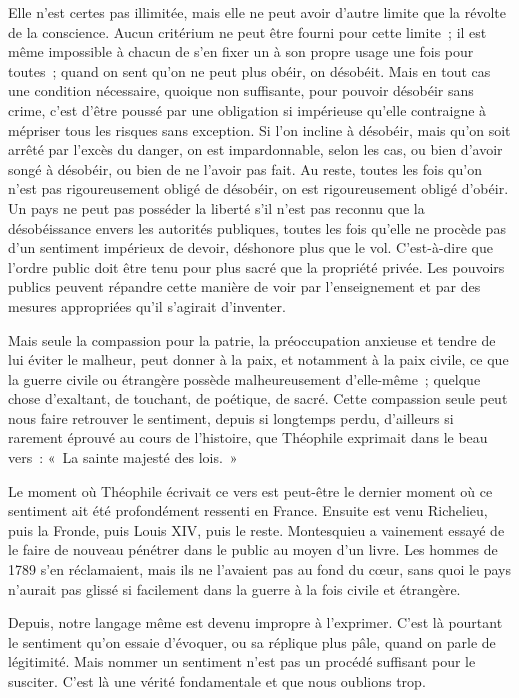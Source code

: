 \documentclass[french,twoside]{book} %
\begin{document}
Elle n'est certes pas illimitée, mais elle ne peut avoir d'autre limite que la révolte de la conscience. Aucun critérium ne peut être fourni pour cette limite ; il est même impossible à chacun de s'en fixer un à son propre usage une fois pour toutes ; quand on sent qu'on ne peut plus obéir, on désobéit. Mais en tout cas une condition nécessaire, quoique non suffisante, pour pouvoir désobéir sans crime, c'est d'être poussé par une obligation si impérieuse qu'elle contraigne à mépriser tous les risques sans exception. Si l'on incline à désobéir, mais qu'on soit arrêté par l'excès du danger, on est impardonnable, selon les cas, ou bien d'avoir songé à désobéir, ou bien de ne l'avoir pas fait. Au reste, toutes les fois qu'on n'est pas rigoureusement obligé de désobéir, on est rigoureusement obligé d'obéir. Un pays ne peut pas posséder la liberté s'il n'est pas reconnu que la désobéissance envers les autorités publiques, toutes les fois qu'elle ne procède pas d'un sentiment impérieux de devoir, déshonore plus que le vol. C'est-à-dire que l'ordre public doit être tenu pour plus sacré que la propriété privée. Les pouvoirs publics peuvent répandre cette manière de voir par l'enseignement et par des mesures appropriées qu'il s'agirait d'inventer.\par
Mais seule la compassion pour la patrie, la préoccupation anxieuse et tendre de lui éviter le malheur, peut donner à la paix, et notamment à la paix civile, ce que la guerre civile ou étrangère possède malheureusement d'elle-même ; quelque chose d'exaltant, de touchant, de poétique, de sacré. Cette compassion seule peut nous faire retrouver le sentiment, depuis si longtemps perdu, d'ailleurs si rarement éprouvé au cours de l'histoire, que Théophile exprimait dans le beau vers : « La sainte majesté des lois. »\par
Le moment où Théophile écrivait ce vers est peut-être le dernier moment où ce sentiment ait été profondément ressenti en France. Ensuite est venu Richelieu, puis la Fronde, puis Louis XIV, puis le reste. Montesquieu a vainement essayé de le faire de nouveau pénétrer dans le public au moyen d'un livre. Les hommes de 1789 s'en réclamaient, mais ils ne l'avaient pas au fond du cœur, sans quoi le pays n'aurait pas glissé si facilement dans la guerre à la fois civile et étrangère.\par
Depuis, notre langage même est devenu impropre à l'exprimer. C'est là pourtant le sentiment qu'on essaie d'évoquer, ou sa réplique plus pâle, quand on parle de légitimité. Mais nommer un sentiment n'est pas un procédé suffisant pour le susciter. C'est là une vérité fondamentale et que nous oublions trop.\par
\end{document}
